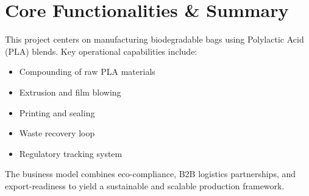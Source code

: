 \section*{Core Functionalities \& Summary}
This project centers on manufacturing biodegradable bags using Polylactic Acid (PLA) blends. Key operational capabilities include:
\begin{itemize}
    \item Compounding of raw PLA materials
    \item Extrusion and film blowing
    \item Printing and sealing
    \item Waste recovery loop
    \item Regulatory tracking system
\end{itemize}
The business model combines eco-compliance, B2B logistics partnerships, and export-readiness to yield a sustainable and scalable production framework.
